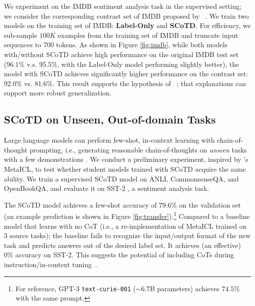 \documentclass[11pt]{article}
\newcommand{\our}{SCoTD\xspace}
\newcommand\jack[1]{{\color{orange}[#1]$_{Jack}$}}
\newcommand\yejin[1]{{\color{magenta}[#1]$_{yejin}$}}
\newcommand\harold[1]{{\color{gray}[#1]$_{harold}$}}
\begin{document}
We experiment on the IMDB \cite{maas2011learning} sentiment analysis task in the supervised setting; we consider the corresponding contrast set of IMDB proposed by ~\citet{gardner2020evaluating}. We train two models on the training set of IMDB: \textbf{Label-Only} and \textbf{\our}. For efficiency, we sub-sample $100K$ examples from the training set of IMDB and truncate input sequences to 700 tokens. 
As shown in Figure \ref{fig:imdb}, while both models with/without \our achieve high performance on the original IMDB test set (96.1\% v.s. 95.5\%, with the Label-Only model performing slightly better), the model with \our achieves significantly higher performance on the contrast set: 92.0\% vs. 81.6\%. This result supports the hypothesis of ~\citep{zaidan-etal-2007-using}; that explanations can support more robust generalization.



\subsection{SCoTD on Unseen, Out-of-domain Tasks} 
\label{sec:sec_with_fully_held_out_task}

Large language models can perform few-shot, in-context learning with chain-of-thought prompting, i.e., generating reasonable chain-of-thoughts on \textit{unseen} tasks with a few demonstrations \cite{suzgun2022challenging}.
We conduct a preliminary experiment, inspired by \citet{min2021metaicl}'s MetaICL, to test whether student models trained with SCoTD acquire the same ability. We train a supervised \our model on ANLI, CommonsenseQA, and OpenBookQA, and evaluate it on SST-2 \cite{socher2013recursive}, a sentiment analysis task.

The SCoTD model achieves a few-shot accuracy of $79.6\%$ on the validation set (an example prediction is shown in Figure \ref{fig:transfer}).\footnote{For reference, GPT-3 \texttt{text-curie-001} ($\sim$6.7B parameters) achieves $74.5\%$ with the same prompt.} %
Compared to a baseline model that learns with no CoT%
(i.e., a re-implementation of MetaICL trained on 3 source tasks); the baseline fails to recognize the input/output format of the new task and predicts answers out of the desired label set. It achieves (an effective)  $0\%$ accuracy on SST-2. %
This suggests the potential of including CoTs during instruction/in-context tuning~\citep{wei2021finetuned,min2021metaicl}.
\end{document}
